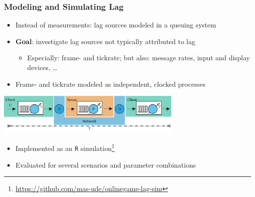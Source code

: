 \documentclass{UDEbeamerEN}
\begin{document}
\begin{frame}
	\frametitle{Modeling and Simulating Lag}

	\begin{itemize}
		\item Instead of measurements: lag sources modeled in a queuing system
		\item \textbf{Goal}: investigate lag sources not typically attributed to lag
		\begin{itemize}
			\item Especially: frame- and tickrate; but also: message rates, input and display devices, \ldots
		\end{itemize}
		\item Frame- and tickrate modeled as independent, clocked processes
	\end{itemize}

	\pause
	\begin{center}
		\includegraphics[height=2cm]{../../../models/e2e-lag-model.pdf}
	\end{center}

	\vspace{-4mm}
	\begin{itemize}
		\item Implemented as an \texttt{R} simulation\footnote[frame]<2->{\url{https://github.com/mas-ude/onlinegame-lag-sim}}
		\item Evaluated for several scenarios and parameter combinations
	\end{itemize}

\end{frame}
\end{document}
